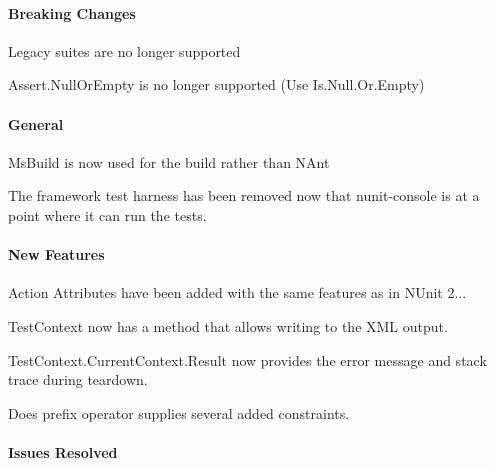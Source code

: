 \paragraph*{Breaking Changes}


\begin{DoxyItemize}
\item Legacy suites are no longer supported
\item Assert.\+Null\+Or\+Empty is no longer supported (Use Is.\+Null.\+Or.\+Empty)
\end{DoxyItemize}

\paragraph*{General}


\begin{DoxyItemize}
\item Ms\+Build is now used for the build rather than N\+Ant
\item The framework test harness has been removed now that nunit-\/console is at a point where it can run the tests.
\end{DoxyItemize}

\paragraph*{New Features}


\begin{DoxyItemize}
\item Action Attributes have been added with the same features as in N\+Unit 2...
\item Test\+Context now has a method that allows writing to the X\+ML output.
\item Test\+Context.\+Current\+Context.\+Result now provides the error message and stack trace during teardown.
\item Does prefix operator supplies several added constraints.
\end{DoxyItemize}

\paragraph*{Issues Resolved}


